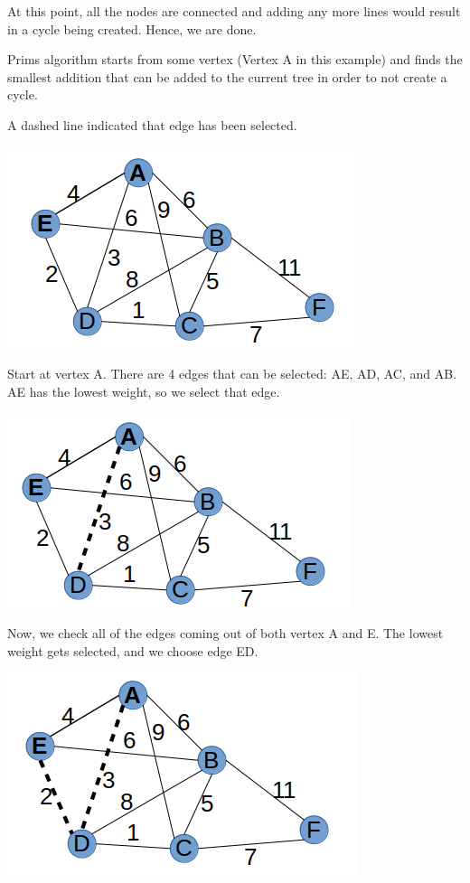 \documentclass{article}
\begin{document}
At this point, all the nodes are connected and adding any more lines would result in a cycle being created. Hence, we are done. 



Prims algorithm starts from some vertex (Vertex A in this example) and finds the smallest addition that can be added to the current tree in order to not create a cycle. 

A dashed line indicated that edge has been selected. 

\includegraphics[scale=0.5]{./P13/prims/0}

Start at vertex A. There are 4 edges that can be selected: AE, AD, AC, and AB. AE has the lowest weight, so we select that edge. 

\includegraphics[scale=0.5]{./P13/prims/1}

Now, we check all of the edges coming out of both vertex A and E. The lowest weight gets selected, and we choose edge ED. 

\includegraphics[scale=0.5]{./P13/prims/2}
\end{document}
